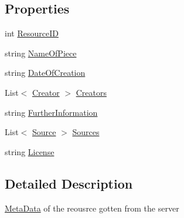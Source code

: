 \subsection*{Properties}
\begin{DoxyCompactItemize}
\item 
int \mbox{\hyperlink{class_virt_muse_web_1_1_models_1_1_meta_data_model_a5d49d277b2680998b79d7c07462baccf}{Resource\+ID}}
\item 
string \mbox{\hyperlink{class_virt_muse_web_1_1_models_1_1_meta_data_model_a7aa6bab63294f59d3f20f74e4a76422d}{Name\+Of\+Piece}}
\item 
string \mbox{\hyperlink{class_virt_muse_web_1_1_models_1_1_meta_data_model_afc58f55a262a38649e368aeb2ec9964e}{Date\+Of\+Creation}}
\item 
List$<$ \mbox{\hyperlink{class_virt_muse_web_1_1_models_1_1_creator}{Creator}} $>$ \mbox{\hyperlink{class_virt_muse_web_1_1_models_1_1_meta_data_model_a61abd7771b24bf4db771f4b7f6f5f14a}{Creators}}
\item 
string \mbox{\hyperlink{class_virt_muse_web_1_1_models_1_1_meta_data_model_ad4dbbe2949c647fa81008650a4e3ef0f}{Further\+Information}}
\item 
List$<$ \mbox{\hyperlink{class_virt_muse_web_1_1_models_1_1_source}{Source}} $>$ \mbox{\hyperlink{class_virt_muse_web_1_1_models_1_1_meta_data_model_ab29deedc1a5e0dd84d5af046e77f7937}{Sources}}
\item 
string \mbox{\hyperlink{class_virt_muse_web_1_1_models_1_1_meta_data_model_a343fb149896049236a06cfbea3b62b1c}{License}}
\end{DoxyCompactItemize}


\subsection{Detailed Description}
\mbox{\hyperlink{class_meta_data}{Meta\+Data}} of the reousrce gotten from the server 



